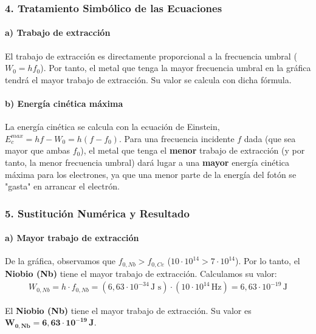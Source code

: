 \subsubsection*{4. Tratamiento Simbólico de las Ecuaciones}
\paragraph{a) Trabajo de extracción}
El trabajo de extracción es directamente proporcional a la frecuencia umbral ($W_0 = hf_0$). Por tanto, el metal que tenga la mayor frecuencia umbral en la gráfica tendrá el mayor trabajo de extracción. Su valor se calcula con dicha fórmula.

\paragraph{b) Energía cinética máxima}
La energía cinética se calcula con la ecuación de Einstein, $E_c^{max} = hf - W_0 = h(f - f_0)$. Para una frecuencia incidente $f$ dada (que sea mayor que ambas $f_0$), el metal que tenga el \textbf{menor} trabajo de extracción (y por tanto, la menor frecuencia umbral) dará lugar a una \textbf{mayor} energía cinética máxima para los electrones, ya que una menor parte de la energía del fotón se "gasta" en arrancar el electrón.

\subsubsection*{5. Sustitución Numérica y Resultado}
\paragraph{a) Mayor trabajo de extracción}
De la gráfica, observamos que $f_{0,Nb} > f_{0,Ce}$ ($10 \cdot 10^{14} > 7 \cdot 10^{14}$). Por lo tanto, el \textbf{Niobio (Nb)} tiene el mayor trabajo de extracción.
Calculamos su valor:
\begin{gather}
    W_{0,Nb} = h \cdot f_{0,Nb} = (6,63 \cdot 10^{-34} \, \text{J s}) \cdot (10 \cdot 10^{14} \, \text{Hz}) = 6,63 \cdot 10^{-19} \, \text{J}
\end{gather}
\begin{cajaresultado}
El \textbf{Niobio (Nb)} tiene el mayor trabajo de extracción. Su valor es $\boldsymbol{W_{0,Nb} = 6,63 \cdot 10^{-19} \, \textbf{J}}$.
\end{cajaresultado}


